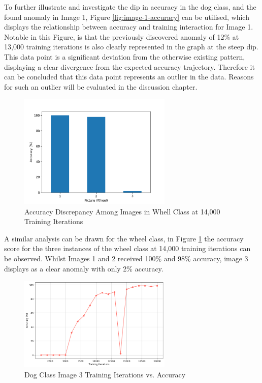 To further illustrate and investigate the dip in accuracy in the dog class, and the found anomaly in Image 1,  Figure \ref{fig:image-1-accuracy} can be utilised, which displays the relationship between accuracy and training interaction for Image 1. Notable in this Figure, is that the previously discovered anomaly of 12\% at 13,000 training iterations is also clearly represented in the graph at the steep dip. This data point is a significant deviation from the otherwise existing pattern, displaying a clear divergence from the expected accuracy trajectory. Therefore it can be concluded that this data point represents an outlier in the data. Reasons for such an outlier will be evaluated in the discussion chapter. 

\begin{figure}[h!]
   \centering
   \includegraphics[width=0.65\textwidth]{../Data/wheel-outliers.png}
   \caption{Accuracy Discrepancy Among Images in Whell Class at 14,000 Training Iterations}
   \label{fig:13000-wheel}
\end{figure}

A similar analysis can be drawn for the wheel class, in Figure \ref{fig:13000-wheel} the accuracy score for the three instances of the wheel class at 14,000 training iterations can be observed. Whilst Images 1 and 2 received 100\% and 98\% accuracy, image 3 displays as a clear anomaly with only 2\% accuracy. 


\begin{figure}[h!]
   \centering
   \includegraphics[width=0.65\textwidth]{../Data/wheel_image1_accuracy_vs_iteration.png}
   \caption{Dog Class Image 3 Training Iterations vs. Accuracy }
   \label{fig:image-3-accuracy}
\end{figure}

